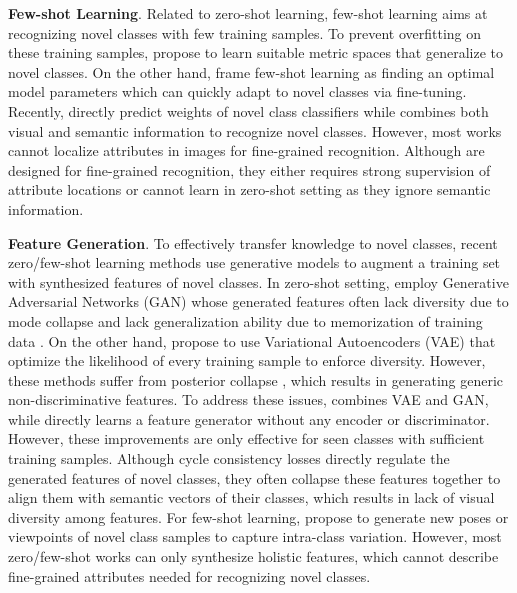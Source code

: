\documentclass[10pt,journal,compsoc]{IEEEtran}
\newcommand{\1}{\boldsymbol{1}}
\newcommand{\0}{\boldsymbol{0}}
\newcommand{\<}{\langle}
\renewcommand{\>}{\rangle}
\newcommand{\myparagraph}[1]{\vspace{-2pt}\medskip\noindent\textbf{#1}}
\begin{document}
\myparagraph{Few-shot Learning}. Related to zero-shot learning, few-shot learning aims at recognizing novel classes with few training samples.
To prevent overfitting on these training samples, \cite{Vinyals:NIPS16,Snell:NISP17,Ren:ICLR18} propose to learn suitable metric spaces that generalize to novel classes.
On the other hand, \cite{Ravi:ICLR17,Finn:ICML17,Rusu:ICLR19} frame few-shot learning as finding an optimal model parameters which can quickly adapt to novel classes via fine-tuning.
Recently, \cite{Qi:CVPR18,Qiao:CVPR18} directly predict weights of novel class classifiers while \cite{Xing:NeurIPS19} combines both visual and semantic information to recognize novel classes.
However, most works cannot localize attributes in images for fine-grained recognition.
Although \cite{Tang:CVPR20,Wertheimer:CVPR19,Zhu:IJCAI20} are designed for fine-grained recognition, they either requires strong supervision of attribute locations or cannot learn in zero-shot setting as they ignore semantic information.

\myparagraph{Feature Generation}.
To effectively transfer knowledge to novel classes, recent zero/few-shot learning methods \cite{Bucher:ICCVW17,Felix:ECCV18,Xian:CVPR19,Schonfeld:CVPR19,Hariharan:ICCV17,Wang:18} use generative models to augment a training set with synthesized features of novel classes. 
In zero-shot setting, \cite{Bucher:ICCVW17,Xian:CVPR18} employ Generative Adversarial Networks (GAN) whose generated features often lack diversity due to mode collapse \cite{Bau:ICCV19,Srivastava:neurIPS17,Che:ICLR17} and lack generalization ability due to memorization of training data \cite{Gulrajani:ICLR19,Webster:CVPR19}. On the other hand, \cite{Arora:CVPR18,Xian:CVPR19,Schonfeld:CVPR19,Yu:neurIPS19} propose to use Variational Autoencoders (VAE) that optimize the likelihood of every training sample to enforce diversity. 
However, these methods suffer from posterior collapse \cite{Lucas:neurIPS19,Oord:neurIPS17,Razavi:ICLR19}, which results in generating generic non-discriminative features. To address these issues, \cite{Xian:CVPR19} combines VAE and GAN, while \cite{Zhu:ICCV19} directly learns a feature generator without any encoder or discriminator. However, these improvements are only effective for seen classes with sufficient training samples. Although cycle consistency losses \cite{Felix:ECCV18,Huang:CVPR19,Ni:neurIPS19} directly regulate the generated features of novel classes, they often collapse these features together to align them with semantic vectors of their classes, which results in lack of visual diversity among features.
For few-shot learning, \cite{Hariharan:ICCV17,Wang:18,Li:CVPR20,Chen:CVPR19,Schwartz:NeurIPS18,Zhang:NeurIPS18} propose to generate new poses or viewpoints of novel class samples to capture intra-class variation. 
However, most zero/few-shot works can only synthesize holistic features, which cannot describe fine-grained attributes needed for recognizing novel classes.
\end{document}
